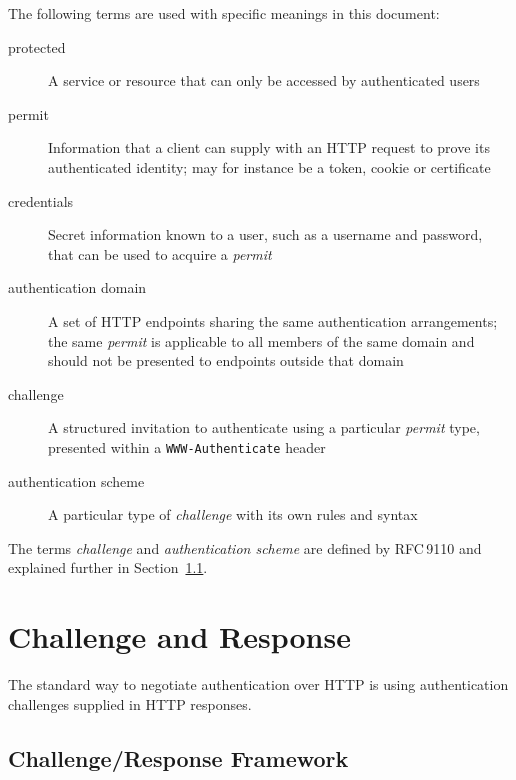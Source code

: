 \documentclass[11pt,a4paper]{ivoa}
\newcommand{\rfc}[1]{RFC\,#1}
\newcommand{\header}[1]{{\tt #1}}
\begin{document}
The following terms are used with specific meanings in this document:

\begin{description}
\item[protected]
      A service or resource that can only be accessed by authenticated users
\item[permit]
      Information that a client can supply with an HTTP request to
      prove its authenticated identity;
      may for instance be a token, cookie or certificate
\item[credentials]
      Secret information known to a user, such as a username and password,
      that can be used to acquire a {\em permit}
\item[authentication domain]
      A set of HTTP endpoints sharing the same authentication arrangements;
      the same {\em permit\/} is applicable to all members of the same domain
      and should not be presented to endpoints outside that domain
\item[challenge]
      A structured invitation to authenticate using
      a particular {\em permit\/} type,
      presented within a \header{WWW-Authenticate} header
\item[authentication scheme]
      A particular type of {\em challenge\/} with its own rules and syntax
\end{description}
The terms {\em challenge\/} and {\em authentication scheme} are
defined by \rfc{9110}
and explained further in Section~\ref{sec:challenge-response}.


\section{Challenge and Response}

The standard way to negotiate authentication over HTTP is using 
authentication challenges supplied in HTTP responses.

\subsection{Challenge/Response Framework}
\label{sec:challenge-response}
\end{document}
